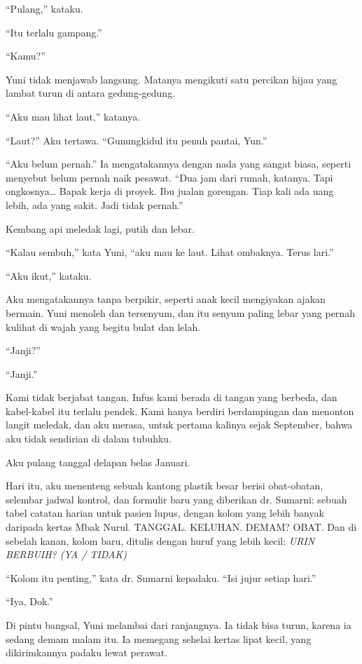 \documentclass[11pt,twoside,openany]{book}
\makeatletter
\newcommand{\scenebreak}{\par\vspace{0.9em}{\centering\textsc{*\hspace{0.7em}*\hspace{0.7em}*}\par}\vspace{0.9em}\@afterindentfalse\@afterheading}
\makeatother
\begin{document}
``Pulang,'' kataku.

``Itu terlalu gampang.''

``Kamu?''

Yuni tidak menjawab langsung. Matanya mengikuti satu percikan hijau yang lambat turun di antara gedung-gedung.

``Aku mau lihat laut,'' katanya.

``Laut?'' Aku tertawa. ``Gunungkidul itu penuh pantai, Yun.''

``Aku belum pernah.'' Ia mengatakannya dengan nada yang sangat biasa, seperti menyebut belum pernah naik pesawat. ``Dua jam dari rumah, katanya. Tapi ongkosnya\ldots{} Bapak kerja di proyek. Ibu jualan gorengan. Tiap kali ada uang lebih, ada yang sakit. Jadi tidak pernah.''

Kembang api meledak lagi, putih dan lebar.

``Kalau sembuh,'' kata Yuni, ``aku mau ke laut. Lihat ombaknya. Terus lari.''

``Aku ikut,'' kataku.

Aku mengatakannya tanpa berpikir, seperti anak kecil mengiyakan ajakan bermain. Yuni menoleh dan tersenyum, dan itu senyum paling lebar yang pernah kulihat di wajah yang begitu bulat dan lelah.

``Janji?''

``Janji.''

Kami tidak berjabat tangan. Infus kami berada di tangan yang berbeda, dan kabel-kabel itu terlalu pendek. Kami hanya berdiri berdampingan dan menonton langit meledak, dan aku merasa, untuk pertama kalinya sejak September, bahwa aku tidak sendirian di dalam tubuhku.

\scenebreak
Aku pulang tanggal delapan belas Januari.

Hari itu, aku menenteng sebuah kantong plastik besar berisi obat-obatan, selembar jadwal kontrol, dan formulir baru yang diberikan dr. Sumarni: sebuah tabel catatan harian untuk pasien lupus, dengan kolom yang lebih banyak daripada kertas Mbak Nurul. TANGGAL. KELUHAN. DEMAM? OBAT. Dan di sebelah kanan, kolom baru, ditulis dengan huruf yang lebih kecil: \emph{URIN BERBUIH? (YA / TIDAK)}

``Kolom itu penting,'' kata dr. Sumarni kepadaku. ``Isi jujur setiap hari.''

``Iya, Dok.''

Di pintu bangsal, Yuni melambai dari ranjangnya. Ia tidak bisa turun, karena ia sedang demam malam itu. Ia memegang sehelai kertas lipat kecil, yang dikirimkannya padaku lewat perawat.
\end{document}
